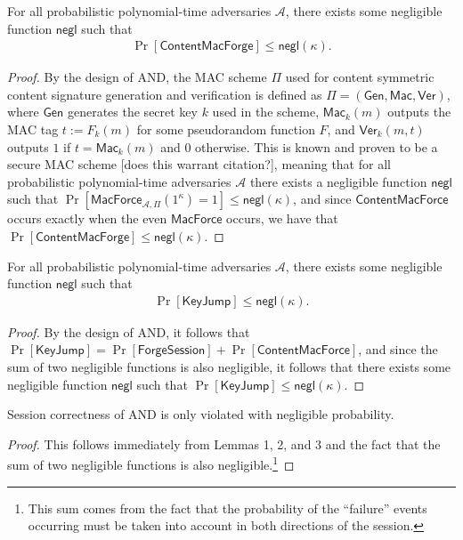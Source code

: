 \begin{lemma}
For all probabilistic polynomial-time adversaries $\mathcal{A}$, there exists some negligible function $\mathsf{negl}$ such that
\begin{align*}
\Pr[\mathsf{ContentMacForge}] \leq \mathsf{negl}(\kappa).
\end{align*}
\end{lemma}
\begin{proof}
By the design of {\sf AND}, the MAC scheme $\Pi$ used for content symmetric content signature generation and verification is defined as $\Pi = (\mathsf{Gen}, \mathsf{Mac}, \mathsf{Ver})$, where $\mathsf{Gen}$ generates the secret key $k$ used in the scheme, $\mathsf{Mac}_k(m)$ outputs the MAC tag $t := F_k(m)$ for some pseudorandom function $F$, and $\mathsf{Ver}_k(m, t)$ outputs $1$ if $t = \mathsf{Mac}_k(m)$ and $0$ otherwise. This is known and proven to be a secure MAC scheme [does this warrant citation?], meaning that for all probabilistic polynomial-time adversaries $\mathcal{A}$ there exists a negligible function $\mathsf{negl}$ such that $\Pr[\mathsf{MacForce}_{\mathcal{A},\Pi}(1^{\kappa}) = 1] \leq \mathsf{negl}(\kappa)$, and since $\mathsf{ContentMacForce}$ occurs exactly when the even $\mathsf{MacForce}$ occurs, we have that $\Pr[\mathsf{ContentMacForge}] \leq \mathsf{negl}(\kappa)$.

\end{proof}

\begin{lemma}
For all probabilistic polynomial-time adversaries $\mathcal{A}$, there exists some negligible function $\mathsf{negl}$ such that
\begin{align*}
\Pr[\mathsf{KeyJump}] \leq \mathsf{negl}(\kappa).
\end{align*}
\end{lemma}
\begin{proof}
By the design of {\sf AND}, it follows that $\Pr[\mathsf{KeyJump}] = \Pr[\mathsf{ForgeSession}] + \Pr[\mathsf{ContentMacForce}]$, and since the sum of two negligible functions is also negligible, it follows that there exists some negligible function $\mathsf{negl}$ such that $\Pr[\mathsf{KeyJump}] \leq \mathsf{negl}(\kappa)$.
\end{proof}

\begin{thm}
Session correctness of {\sf AND} is only violated with negligible probability.
\end{thm}
\begin{proof}
This follows immediately from Lemmas 1, 2, and 3 and the fact that the sum of two negligible functions is also negligible.\footnote{This sum comes from the fact that the probability of the ``failure'' events occurring must be taken into account in both directions of the session.} 
\end{proof}
